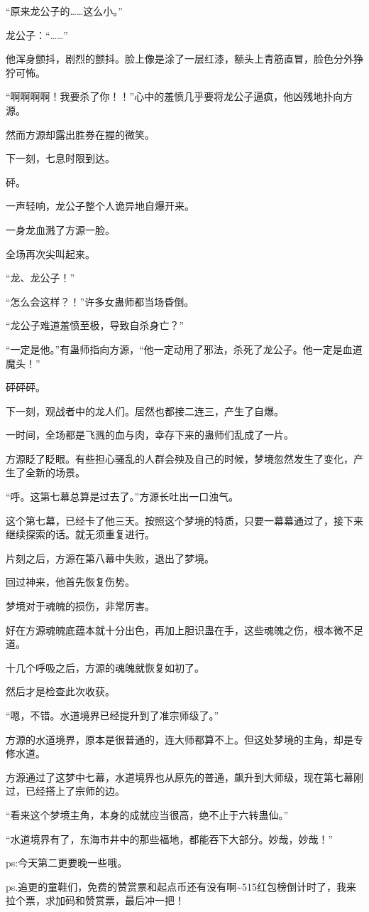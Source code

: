 \begin{this_body}
“原来龙公子的……这么小。”

龙公子：“……”

他浑身颤抖，剧烈的颤抖。脸上像是涂了一层红漆，额头上青筋直冒，脸色分外狰狞可怖。

“啊啊啊啊！我要杀了你！！”心中的羞愤几乎要将龙公子逼疯，他凶残地扑向方源。

然而方源却露出胜券在握的微笑。

下一刻，七息时限到达。

砰。

一声轻响，龙公子整个人诡异地自爆开来。

一身龙血溅了方源一脸。

全场再次尖叫起来。

“龙、龙公子！”

“怎么会这样？！”许多女蛊师都当场昏倒。

“龙公子难道羞愤至极，导致自杀身亡？”

“一定是他。”有蛊师指向方源，“他一定动用了邪法，杀死了龙公子。他一定是血道魔头！”

砰砰砰。

下一刻，观战者中的龙人们。居然也都接二连三，产生了自爆。

一时间，全场都是飞溅的血与肉，幸存下来的蛊师们乱成了一片。

方源眨了眨眼。有些担心骚乱的人群会殃及自己的时候，梦境忽然发生了变化，产生了全新的场景。

“呼。这第七幕总算是过去了。”方源长吐出一口浊气。

这个第七幕，已经卡了他三天。按照这个梦境的特质，只要一幕幕通过了，接下来继续探索的话。就无须重复进行。

片刻之后，方源在第八幕中失败，退出了梦境。

回过神来，他首先恢复伤势。

梦境对于魂魄的损伤，非常厉害。

好在方源魂魄底蕴本就十分出色，再加上胆识蛊在手，这些魂魄之伤，根本微不足道。

十几个呼吸之后，方源的魂魄就恢复如初了。

然后才是检查此次收获。

“嗯，不错。水道境界已经提升到了准宗师级了。”

方源的水道境界，原本是很普通的，连大师都算不上。但这处梦境的主角，却是专修水道。

方源通过了这梦中七幕，水道境界也从原先的普通，飙升到大师级，现在第七幕刚过，已经搭上了宗师的边。

“看来这个梦境主角，本身的成就应当很高，绝不止于六转蛊仙。”

“水道境界有了，东海市井中的那些福地，都能吞下大部分。妙哉，妙哉！”

ps:今天第二更要晚一些哦。

ps.追更的童鞋们，免费的赞赏票和起点币还有没有啊\~{}515红包榜倒计时了，我来拉个票，求加码和赞赏票，最后冲一把！

\end{this_body}

